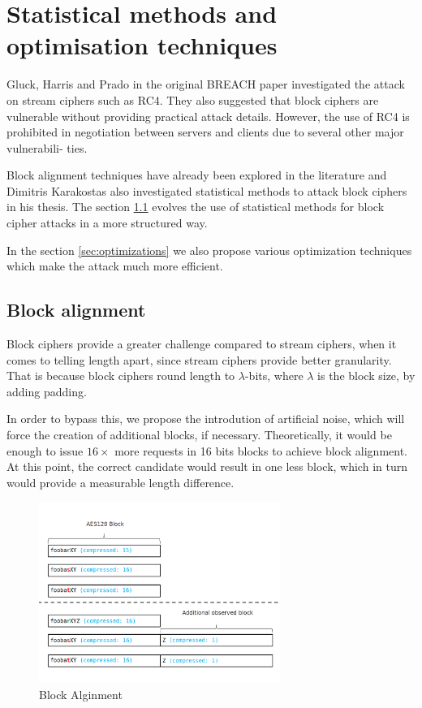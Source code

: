 \chapter{Statistical methods and optimisation techniques}\label{statistic_methods}

Gluck, Harris and Prado in the original BREACH paper investigated the attack on
stream ciphers such as RC4. They also suggested that block ciphers are vulnerable
without providing practical attack details. However, the use of RC4 is prohibited in
negotiation between servers and clients \cite{rc4_prohibit} due to several other major vulnerabili-
ties. 

Block alignment techniques have already been explored in the literature \cite{poodle} and 
Dimitris Karakostas\cite{karakostas} also investigated statistical methods
to attack block ciphers in his thesis.
The section \ref{sec:blockalign} evolves the use of statistical
methods for block cipher attacks in a more structured way.

In the section \ref{sec:optimizations} we also propose various optimization techniques which
make the attack much more efficient.

\section{Block alignment}\label{sec:blockalign}

Block ciphers provide a greater challenge compared to stream ciphers, when it
comes to telling length apart, since stream ciphers provide better granularity. That
is because block ciphers round length to $\lambda$-bits, where $\lambda$ is the block size,
by adding padding.

In order to bypass this, we propose the introdution of artificial noise, 
which will force the creation of additional blocks, if necessary. 
Theoretically, it would be enough to issue $16\times$ more requests in 16 bits blocks
to achieve block alignment. At this point, the correct candidate would result in one less
block, which in turn would provide a measurable length difference. 


\begin{figure}[H] \caption{Block Alginment} \centering
\includegraphics[width=0.7\textwidth]{diagrams/block_alignment.png}\end{figure}

